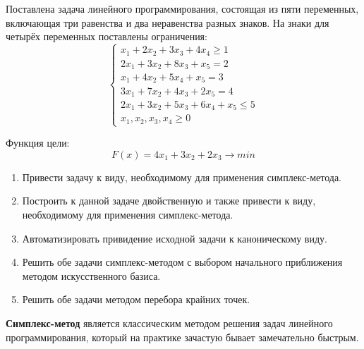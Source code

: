 \documentclass[../body.tex]{subfiles}
\begin{document}
Поставлена задача линейного программирования, состоящая из пяти переменных, включающая три равенства и два неравенства разных знаков. На знаки для четырёх переменных поставлены ограничения:
\begin{equation}\label{eq:limitation}
\left\{
\begin{array}{ll} 
	x_1+2x_2+3x_3+4x_4 \ge 1\\
	2x_1+3x_2+8x_3+x_5=2\\
	x_1+4x_2+5x_4+x_5=3\\
	3x_1+7x_2+4x_3+2x_5 = 4\\
	2x_1+3x_2+5x_3+6x_4+x_5 \le 5\\
	x_1,x_2,x_3,x_4 \ge 0
\end{array}
\right.
\end{equation}

Функция цели:
\begin{equation}\label{eq:goal}
F(x) =  4x_1 + 3x_2 + 2x_3 \longrightarrow min 
\end{equation}
\begin{enumerate}
	\item Привести задачу к виду, необходимому для применения симплекс-метода.
	\item Построить к данной задаче двойственную и также привести к виду, необходимому для применения симплекс-метода.
	\item Автоматизировать привидение исходной задачи к каноническому виду.
	\item Решить обе задачи симплекс-методом с выбором начального приближения методом искусственного базиса.
	\item Решить обе задачи методом перебора крайних точек.
\end{enumerate}
	\textbf{Симплекс-метод} является классическим методом решения задач линейного программирования, который на практике зачастую бывает замечательно быстрым.
\end{document}
